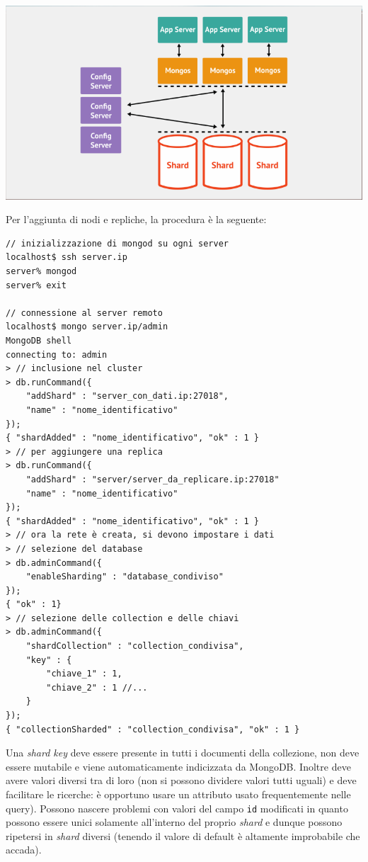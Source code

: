 \documentclass[a4page, 11pt]{article}
\begin{document}
\begin{center}
  \includegraphics[scale=0.40]{IMAGE6.png}
\end{center}

Per l'aggiunta di nodi e repliche, la procedura è la seguente:
\begin{verbatim}
// inizializzazione di mongod su ogni server
localhost$ ssh server.ip
server% mongod
server% exit

// connessione al server remoto
localhost$ mongo server.ip/admin
MongoDB shell
connecting to: admin
> // inclusione nel cluster
> db.runCommand({
    "addShard" : "server_con_dati.ip:27018",
    "name" : "nome_identificativo"
});
{ "shardAdded" : "nome_identificativo", "ok" : 1 }
> // per aggiungere una replica
> db.runCommand({
    "addShard" : "server/server_da_replicare.ip:27018"
    "name" : "nome_identificativo"
});
{ "shardAdded" : "nome_identificativo", "ok" : 1 }
> // ora la rete è creata, si devono impostare i dati
> // selezione del database
> db.adminCommand({
    "enableSharding" : "database_condiviso"
});
{ "ok" : 1}
> // selezione delle collection e delle chiavi
> db.adminCommand({
    "shardCollection" : "collection_condivisa",
    "key" : {
        "chiave_1" : 1,
        "chiave_2" : 1 //...
    }
});
{ "collectionSharded" : "collection_condivisa", "ok" : 1 }
\end{verbatim}

Una \textit{shard key} deve essere presente in tutti i documenti della collezione, non deve essere mutabile e viene automaticamente indicizzata da MongoDB.
Inoltre deve avere valori diversi tra di loro (non si possono dividere valori tutti uguali) e deve facilitare le ricerche: è opportuno usare un attributo usato frequentemente nelle query).
Possono nascere problemi con valori del campo \verb|id| modificati in quanto possono essere unici solamente all'interno del proprio \textit{shard} e dunque possono ripetersi in \textit{shard} diversi (tenendo il valore di default è altamente improbabile che accada).

\newpage
\printbibliography[title={Letture di approfondimento}]
\end{document}
